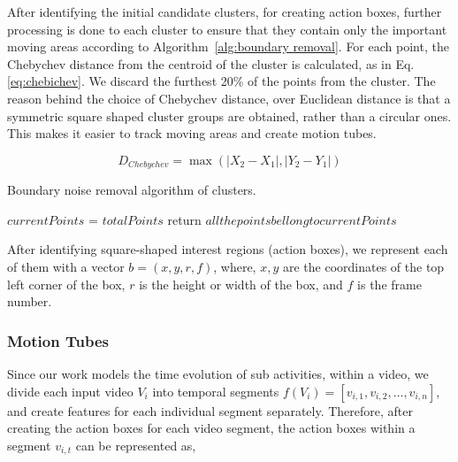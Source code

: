 After identifying the initial candidate clusters, for creating action boxes, further processing is done to each cluster to ensure that they
contain only the important moving areas according to Algorithm~\ref{alg:boundary removal}. For each point, the Chebychev distance from the centroid of the cluster is calculated,
as in
Eq. \ref{eq:chebichev}. We discard the furthest 20\% of the points from the cluster. The reason behind the choice of Chebychev
distance, over Euclidean distance is that a symmetric square shaped cluster groups are obtained, rather than a circular ones. This makes it
easier to track moving areas and create motion tubes.

\begin{equation}\label{eq:chebichev}
 D_{Chebychev} = \max(|X_{2} - X_{1}|,|Y_{2}-Y_{1}|)
\end{equation}

\begin{algorithm*}
   \caption{Boundary noise removal algorithm of clusters.}
   \label{alg:boundary removal}
    \begin{algorithmic}[1]
	\State $currentPoints$ = $totalPoints$
	    \State return $all the points bellong to currentPoints$
	  \EndIf
	
	\EndWhile
     \EndFunction


\end{algorithmic}
\end{algorithm*}

After identifying square-shaped interest regions (action boxes), we represent each of them with a vector $b = (x,y,r,f)$, where, $x,y$ are the coordinates
of the top left corner of the box, $r$ is the height or width of the box, and $f$ is the frame number.


\subsubsection{Motion Tubes}
Since our work models the time evolution of sub activities, within a video, we divide each input video $V_{i}$ into temporal segments $f(V_{i}) = [v_{i,1},
v_{i,2}, \dots, v_{i,n}]$,
and create features for each individual segment separately. Therefore, after creating the action boxes for each video segment,
the action boxes within a segment $v_{i,t}$ can be represented as,

